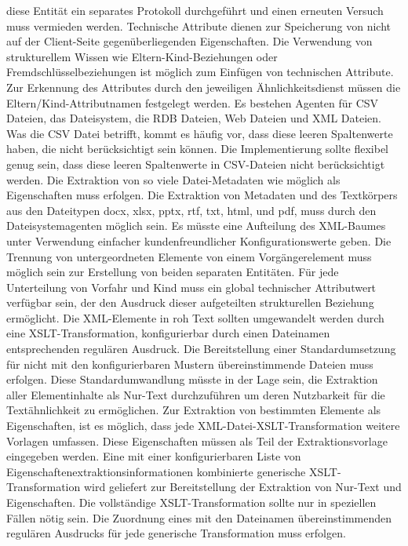 diese Entität ein separates Protokoll durchgeführt und einen erneuten Versuch muss vermieden werden. Technische Attribute dienen zur Speicherung von nicht auf der Client-Seite gegenüberliegenden Eigenschaften. Die Verwendung von strukturellem Wissen wie Eltern-Kind-Beziehungen oder Fremdschlüsselbeziehungen ist möglich zum Einfügen von technischen Attribute. Zur Erkennung des Attributes durch den jeweiligen Ähnlichkeitsdienst müssen die Eltern/Kind-Attributnamen festgelegt werden. Es bestehen Agenten für CSV Dateien, das Dateisystem, die RDB Dateien, Web Dateien und XML Dateien. Was die CSV Datei betrifft, kommt es häufig vor, dass diese leeren Spaltenwerte haben, die nicht berücksichtigt sein können. Die Implementierung sollte flexibel genug sein, dass diese leeren Spaltenwerte in CSV-Dateien nicht berücksichtigt werden. Die Extraktion von so viele Datei-Metadaten wie möglich als Eigenschaften muss erfolgen. Die Extraktion von Metadaten und des Textkörpers aus den Dateitypen docx, xlsx, pptx, rtf, txt, html, und pdf, muss durch den Dateisystemagenten möglich sein. Es müsste eine Aufteilung des XML-Baumes unter Verwendung einfacher kundenfreundlicher Konfigurationswerte geben. Die Trennung von untergeordneten Elemente von einem Vorgängerelement muss möglich sein zur Erstellung von beiden separaten Entitäten. Für jede Unterteilung von Vorfahr und Kind muss ein global technischer Attributwert verfügbar sein, der den Ausdruck dieser aufgeteilten strukturellen Beziehung ermöglicht. Die XML-Elemente in roh Text sollten umgewandelt werden durch eine XSLT-Transformation, konfigurierbar durch einen Dateinamen entsprechenden regulären Ausdruck. Die Bereitstellung einer Standardumsetzung für nicht mit den konfigurierbaren Mustern übereinstimmende Dateien muss erfolgen. Diese Standardumwandlung müsste in der Lage sein, die Extraktion aller Elementinhalte als Nur-Text durchzuführen um deren Nutzbarkeit für die Textähnlichkeit zu ermöglichen. Zur Extraktion von bestimmten Elemente als Eigenschaften, ist es möglich, dass jede XML-Datei-XSLT-Transformation weitere Vorlagen umfassen. Diese Eigenschaften müssen als Teil der Extraktionsvorlage eingegeben werden. Eine mit einer konfigurierbaren Liste von Eigenschaftenextraktionsinformationen kombinierte generische XSLT-Transformation wird geliefert zur Bereitstellung der Extraktion von Nur-Text und Eigenschaften. Die vollständige XSLT-Transformation sollte nur in speziellen Fällen nötig sein. Die Zuordnung eines mit den Dateinamen übereinstimmenden regulären Ausdrucks für jede generische Transformation muss erfolgen.

